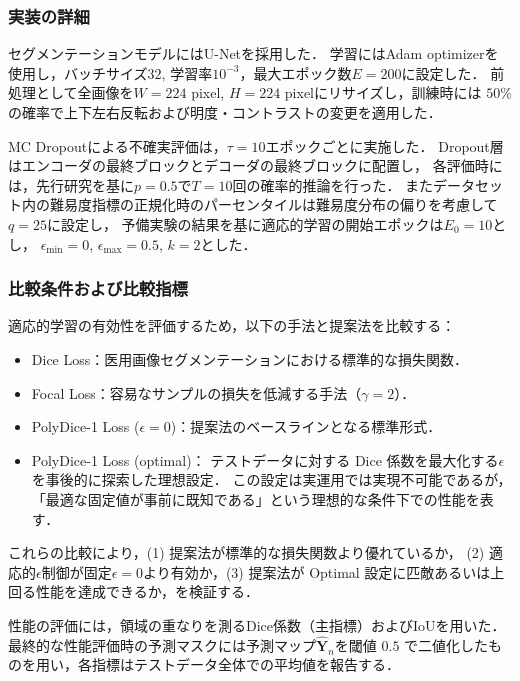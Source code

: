 \documentclass[a4paper,platex,dvipdfmx,twocolumn]{jsarticle}
\begin{document}
\subsubsection{実装の詳細}
セグメンテーションモデルにはU-Net\cite{ronneberger2015u}を採用した．
学習にはAdam optimizer\cite{kingma2014adam}を使用し，バッチサイズ$32$, 学習率$10 ^ {-3}$，最大エポック数$E=200$に設定した．
前処理として全画像を$W = 224$ pixel, $H = 224$ pixelにリサイズし，訓練時には
$50\%$の確率で上下左右反転および明度・コントラストの変更を適用した．

MC Dropoutによる不確実評価は，$\tau=10$エポックごとに実施した．
Dropout層はエンコーダの最終ブロックとデコーダの最終ブロックに配置し，
各評価時には，先行研究\cite{pmlr-v48-gal16}を基に$p = 0.5$で$T = 10$回の確率的推論を行った．
またデータセット内の難易度指標の正規化時のパーセンタイルは難易度分布の偏りを考慮して$q = 25$に設定し，
予備実験の結果を基に適応的学習の開始エポックは$E_0 = 10$とし，
$\epsilon_{\text{min}}=0$, $\epsilon_{\text{max}}=0.5$, $k=2$とした．


\subsubsection{比較条件および比較指標}
適応的学習の有効性を評価するため，以下の手法と提案法を比較する：

\begin{itemize}
    \item Dice Loss\cite{milletari2016v}：医用画像セグメンテーションにおける標準的な損失関数．
    \item Focal Loss\cite{lin2017focal}：容易なサンプルの損失を低減する手法（$\gamma = 2$）．
    \item PolyDice-1 Loss ($\epsilon = 0$)：提案法のベースラインとなる標準形式．
    \item PolyDice-1 Loss (optimal)：
    テストデータに対する Dice 係数を最大化する$\epsilon$を事後的に探索した理想設定．
    この設定は実運用では実現不可能であるが，
    「最適な固定値が事前に既知である」という理想的な条件下での性能を表す．
\end{itemize}
これらの比較により，(1) 提案法が標準的な損失関数より優れているか，
(2) 適応的$\epsilon$制御が固定$\epsilon = 0$より有効か，(3) 提案法が Optimal 設定に匹敵あるいは上回る性能を達成できるか，を検証する．

性能の評価には，領域の重なりを測るDice係数（主指標）およびIoUを用いた．
最終的な性能評価時の予測マスクには予測マップ$\hat{\mathbf{Y}}_n$を閾値 $0.5$ で二値化したものを用い，各指標はテストデータ全体での平均値を報告する．
\end{document}
